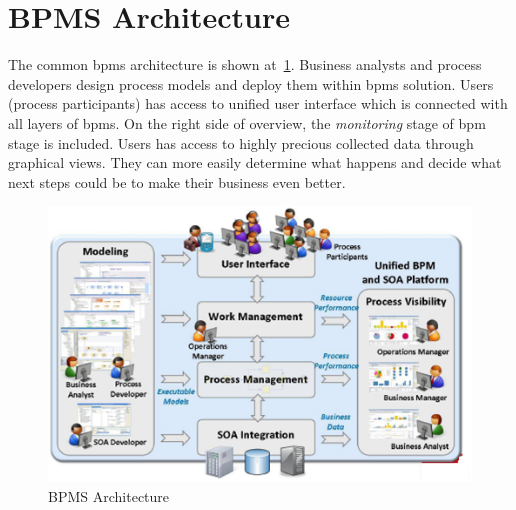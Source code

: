 
\section{BPMS Architecture}
The common \gls{bpms} architecture is shown at~\cref{fig:bpms-architecture}. Business analysts and process developers design process models and deploy them within \gls{bpms} solution. Users (process participants) has access to unified user interface which is connected with all layers of \gls{bpms}. On the right side of overview, the \textit{monitoring} stage of \gls{bpm} stage is included. Users has access to highly precious collected data through graphical views. They can more easily determine what happens and decide what next steps could be to make their business even better. 

\begin{figure}[ht!]
	\centering
    \includegraphics[width=12cm]{img/tibco-bpm-architecture.png}
    \caption{BPMS Architecture\cite{tibco-bpm-2016}}
    \label{fig:bpms-architecture}
\end{figure}

